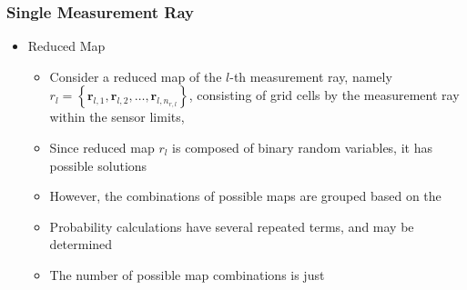 \documentclass[11pt,professionalfonts,hyperref={pdftex,pdfpagemode=none,pdfstartview=FitH}]{beamer}
\newcommand{\braces}[1]{\ensuremath{\left\{ #1 \right\}}}
\renewcommand{\emph}[1]{\textit{\textbf{\color{blue}{#1}}}}
\begin{document}
\begin{frame}
\frametitle{Single Measurement Ray}
\begin{itemize}
    \item Reduced Map
	\begin{itemize}
		\item Consider a reduced map of the $l$-th measurement ray, namely $r_l=\braces{\mathbf{r}_{l,1},\mathbf{r}_{l,2},\ldots,\mathbf{r}_{l,n_{r,l}}}$, consisting of grid cells \emph{intersected} by the measurement ray within the sensor limits, \emph{indexed by increasing distance}
		\item Since reduced map $r_l$ is composed of binary random variables, it has \emph{$2^{n_{r,l}}$} possible solutions
		\item However, the combinations of possible maps are grouped based on the \emph{closest occupied cells}
		\item Probability calculations have several repeated terms, and may be determined \emph{recursively}
		\item The number of possible map combinations is just \emph{$n_{r,l}+1$}
	\end{itemize}
\end{itemize}
\end{frame}
\end{document}
